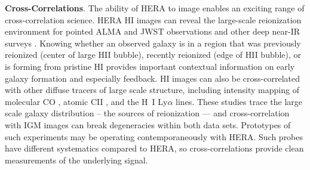 \documentclass[preprint]{aastex}
\newcommand{\compress}{\vspace{-0.3in}}
\begin{document}



{\bf Cross-Correlations}. The ability of HERA to image enables an exciting range of cross-correlation science.
HERA HI images can reveal the large-scale reionization environment for pointed ALMA and JWST
observations and other deep near-IR surveys \citep{lidz_et_al2009}.
Knowing whether an observed galaxy is in a region that  was
previously reionized (center of large HII bubble), recently reionized (edge of HII bubble), or is forming from
pristine HI provides important contextual information on early galaxy formation and especially feedback.
HI images can also be cross-correlated with other diffuse
tracers of large scale structure, including intensity
mapping of molecular  CO \cite{lidz_et_al2011}, atomic CII \citep{gong_et_al2011}, and the H~I Ly$\alpha$ \citep{silva_et_al2013} lines. These studies
trace the large scale galaxy distribution -- the sources of reionization — and cross-correlation 
with IGM images can break degeneracies within both data sets. Prototypes of such experiments
may be operating contemporaneously with HERA. Such probes have different systematics
compared to HERA, so cross-correlations provide clean measurements of the underlying signal.

\end{document}
